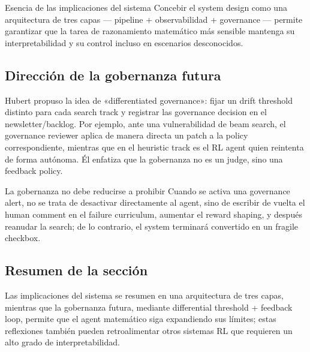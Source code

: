 \documentclass[a4paper]{article}
\begin{document}
\begin{knowledgebox}{Esencia de las implicaciones del sistema}
Concebir el system design como una arquitectura de tres capas — pipeline + observabilidad + governance — permite garantizar que la tarea de razonamiento matemático más sensible mantenga su interpretabilidad y su control incluso en escenarios desconocidos.
\end{knowledgebox}

\subsection{Dirección de la gobernanza futura}
Hubert propuso la idea de «differentiated governance»: fijar un drift threshold distinto para cada search track y registrar las governance decision en el newsletter/backlog. Por ejemplo, ante una vulnerabilidad de beam search, el governance reviewer aplica de manera directa un patch a la policy correspondiente, mientras que en el heuristic track es el RL agent quien reintenta de forma autónoma. Él enfatiza que la gobernanza no es un judge, sino una feedback policy.

\begin{warningbox}{La gobernanza no debe reducirse a prohibir}
Cuando se activa una governance alert, no se trata de desactivar directamente al agent, sino de escribir de vuelta el human comment en el failure curriculum, aumentar el reward shaping, y después reanudar la search; de lo contrario, el system terminará convertido en un fragile checkbox.
\end{warningbox}

\subsection{Resumen de la sección}
Las implicaciones del sistema se resumen en una arquitectura de tres capas, mientras que la gobernanza futura, mediante differential threshold + feedback loop, permite que el agent matemático siga expandiendo sus límites; estas reflexiones también pueden retroalimentar otros sistemas RL que requieren un alto grado de interpretabilidad.
\newpage
\end{document}
